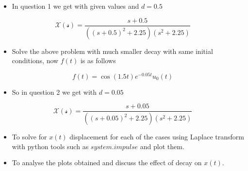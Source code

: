 \documentclass[11pt]{article}
\providecommand{\tightlist}{%
      \setlength{\itemsep}{0pt}\setlength{\parskip}{0pt}}
\begin{document}
\begin{itemize}
\tightlist
\item
  In question 1 we get with given values and \(d = 0.5\)
\end{itemize}

\begin{equation}
    \mathcal{X(s)} = \frac{s+0.5}{((s+0.5)^2 + 2.25)(s^2 + 2.25)}
\end{equation}

\begin{itemize}
\tightlist
\item
  Solve the above problem with much smaller decay with same initial
  conditions, now \(f(t)\) is as follows
\end{itemize}

\begin{equation}
f(t) = \cos(1.5t) e^{-0.05t}u_0(t)
\end{equation}

\begin{itemize}
\tightlist
\item
  So in question 2 we get with \(d = 0.05\)
\end{itemize}

\begin{equation}
    \mathcal{X(s)} = \frac{s+0.05}{((s+0.05)^2 + 2.25)(s^2 + 2.25)}
\end{equation}

\begin{itemize}
\tightlist
\item
  To solve for \(x(t)\) displacement for each of the cases using Laplace
  transform with python tools such as \(system.impulse\) and plot them.
\item
  To analyse the plots obtained and discuss the effect of decay on
  \(x(t)\).
\end{itemize}
\end{document}
